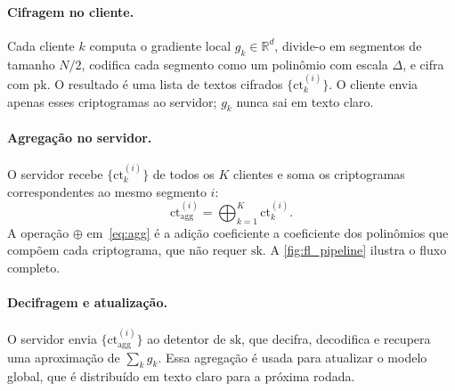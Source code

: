 \documentclass[11pt,a4paper]{article}
\begin{document}
\paragraph{Cifragem no cliente.}
Cada cliente $k$ computa o gradiente local $g_k \in \mathbb{R}^d$, divide-o em
segmentos de tamanho $N/2$, codifica cada segmento como um polinômio com escala
$\Delta$, e cifra com $\text{pk}$. O resultado é uma lista de textos cifrados
$\{\text{ct}_k^{(i)}\}$. O cliente envia apenas esses criptogramas ao servidor;
$g_k$ nunca sai em texto claro.

\paragraph{Agregação no servidor.}
O servidor recebe $\{\text{ct}_k^{(i)}\}$ de todos os $K$ clientes e soma os
criptogramas correspondentes ao mesmo segmento $i$:
\begin{equation}
  \text{ct}_{\text{agg}}^{(i)} = \bigoplus_{k=1}^{K} \text{ct}_k^{(i)}.
  \label{eq:agg}
\end{equation}
A operação $\oplus$ em~\eqref{eq:agg} é a adição coeficiente a coeficiente dos
polinômios que compõem cada criptograma, que não requer $\text{sk}$. A
\cref{fig:fl_pipeline} ilustra o fluxo completo.

\paragraph{Decifragem e atualização.}
O servidor envia $\{\text{ct}_{\text{agg}}^{(i)}\}$ ao detentor de $\text{sk}$, que
decifra, decodifica e recupera uma aproximação de $\sum_k g_k$. Essa agregação é
usada para atualizar o modelo global, que é distribuído em texto claro para a próxima
rodada.
\end{document}
